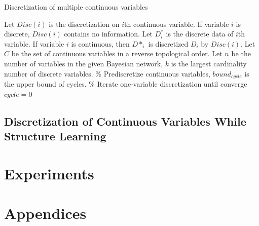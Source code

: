 \begin{algorithm}
\caption{ Discretization of multiple continuous variables}
\begin{algorithmic}[1]
\State Let $Disc(i)$ is the discretization on $i$th continuous variable. If variable $i$ is discrete, $Disc(i)$ contains no information. 
\State Let $D^*_i$ is the discrete data of $i$th variable. If variable $i$ is continuous, then $D*_i$ is discretized $D_i$ by $Disc(i)$.
\State Let $C$ be the set of continuous variables in a reverse topological order.
\State Let $n$ be the number of variables in the given Bayesian network, $k$ is the largest cardinality number of discrete variables.
\State \% Prediscretize continuous variables, $bound_{cycle}$ is the upper bound of cycles.
\EndIf
\EndFor
\State \% Iterate one-variable discretization until converge
\State $cycle = 0$
\EndFor
\EndWhile
\end{algorithmic}
\end{algorithm}

\subsection{Discretization of Continuous Variables While Structure Learning}
\label{SL}


\section{Experiments}









\section*{Appendices}



